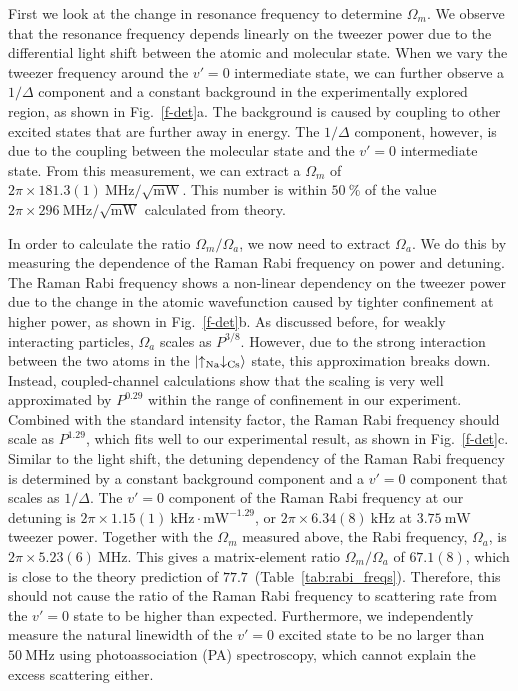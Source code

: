\documentclass[aps,prl,twocolumn,10pt,superscriptaddress]{revtex4-1}
\begin{document}
First we look at the change in resonance frequency to determine $\Omega_m$.
We observe that the resonance frequency depends linearly on the tweezer power due to the differential light shift between the atomic and molecular state.
When we vary the tweezer frequency around the $v'=0$ intermediate state,
we can further observe a $1/\Delta$ component
and a constant background in the experimentally explored region, as shown in Fig.~\ref{f-det}a.
The background is caused by coupling to other excited states that are further away in energy.
The $1/\Delta$ component, however, is due to the coupling between the molecular state
and the $v'=0$ intermediate state.
From this measurement, we can extract a $\Omega_m$ of
$2\pi\times181.3(1)~\mathrm{MHz}/\sqrt{\mathrm{mW}}$.
This number is within $50~\mathrm{\%}$
of the value $2\pi\times296 ~\mathrm{MHz}/\sqrt{\mathrm{mW}}$ calculated from theory.

In order to calculate the ratio $\Omega_m/\Omega_a$,
we now need to extract $ \Omega_a $.
We do this by measuring the dependence of the Raman Rabi frequency on power and detuning.
The Raman Rabi frequency shows a non-linear dependency on the tweezer power
due to the change in the atomic wavefunction caused by
tighter confinement at higher power, as shown in Fig.~\ref{f-det}b.
As discussed before, for weakly interacting particles,
$\Omega_a$ scales as $P^{3/8}$.
However, due to the strong interaction between the two atoms in the $\ket{\uparrow_{\text{Na}}\downarrow_{\text{Cs}}}$ state, this approximation breaks down.
Instead, coupled-channel calculations show that the scaling
is very well approximated by $P^{0.29}$ within the range of confinement in our experiment.
Combined with the standard intensity factor, the Raman Rabi frequency should scale as $P^{1.29}$,
which fits well to our experimental result, as shown in Fig.~\ref{f-det}c.
Similar to the light shift, the detuning dependency of the Raman Rabi frequency
is determined by a constant background component and
a $v'=0$ component that scales as $1/\Delta$.
The $v'=0$ component of the Raman Rabi frequency at our detuning is
$2\pi\times1.15(1)~\mathrm{kHz\cdot mW^{-1.29}}$,
or $2\pi \times 6.34(8)~\mathrm{kHz}$ at $3.75~\mathrm{mW}$ tweezer power.
Together with the $\Omega_m$ measured above, the Rabi frequency, $\Omega_a$, is
$2\pi\times 5.23(6)~\mathrm{MHz}$.
This gives a matrix-element ratio $\Omega_m/\Omega_a$ of $67.1(8)$,
which is close to the theory prediction of $77.7$~(Table~\ref{tab:rabi_freqs}).
Therefore, this should not cause the ratio of the Raman Rabi frequency to scattering rate
from the $v'=0$ state to be higher than expected.
Furthermore, we independently measure the natural linewidth of the $v'=0$ excited state to be no larger than $50~\mathrm{MHz}$ using photoassociation (PA) spectroscopy, which cannot explain the excess scattering either.
\end{document}
